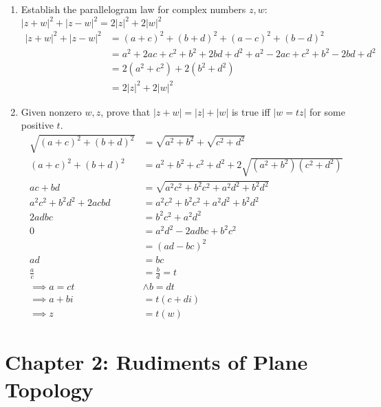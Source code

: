 \documentclass[12pt,a4paper]{article}
\begin{document}
\begin{enumerate}[label={\bfseries I.4.\arabic*}]
	\item Establish the parallelogram law for complex numbers $z,w$: $|z+w|^2 + |z-w|^2 = 2|z|^2 + 2|w|^2$
	\begin{align}
    |z+w|^2 + |z-w|^2 &= (a+c)^2 + (b+d)^2 + (a-c)^2 + (b-d)^2 \\
    &= a^2 + 2ac + c^2 + b^2 + 2bd + d^2 + a^2 -2ac + c^2 + b^2 -2bd + d^2 \\
    &= 2(a^2 + c^2) +2(b^2 + d^2) \\
    &= 2|z|^2 + 2|w|^2
	\end{align}

	\item Given nonzero $w,z$, prove that $|z+w|=|z|+|w|$ is true iff $|w=tz|$ for some positive $t$.
	\begin{align}
    \sqrt{(a+c)^2+(b+d)^2} &= \sqrt{a^2+b^2} + \sqrt{c^2 + d^2} \\
    (a+c)^2 + (b+d)^2 &= a^2 + b^2 + c^2 + d^2 + 2\sqrt{(a^2+b^2)(c^2+d^2)} \\
    ac + bd &= \sqrt{a^2c^2 +b^2c^2 + a^2d^2 + b^2d^2} \\
    a^2c^2 + b^2d^2 + 2acbd &= a^2c^2 + b^2c^2 + a^2d^2 + b^2d^2 \\
    2adbc &= b^2c^2 + a^2d^2 \\
    0 &= a^2d^2 - 2adbc + b^2c^2 \\
    &= (ad-bc)^2 \\
    ad &= bc \\
    \frac{a}{c} &= \frac{b}{d} = t \\
    \implies a = ct &\land b=dt \\
    \implies a+bi &= t(c+di) \\
    \implies z &= t(w)
	\end{align}
\end{enumerate}

\section*{Chapter 2: Rudiments of Plane Topology}
\end{document}
